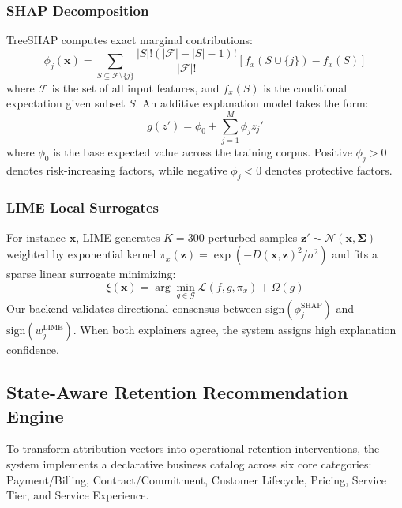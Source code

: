 \documentclass[conference]{IEEEtran}
\begin{document}
\subsubsection{SHAP Decomposition}
TreeSHAP computes exact marginal contributions:
\begin{equation}
    \phi_j(\mathbf{x}) = \sum_{S \subseteq \mathcal{F} \setminus \{j\}} \frac{|S|!(|\mathcal{F}| - |S| - 1)!}{|\mathcal{F}|!} \left[ f_x(S \cup \{j\}) - f_x(S) \right]
\end{equation}
where $\mathcal{F}$ is the set of all input features, and $f_x(S)$ is the conditional expectation given subset $S$. An additive explanation model takes the form:
\begin{equation}
    g(z') = \phi_0 + \sum_{j=1}^M \phi_j z_j'
\end{equation}
where $\phi_0$ is the base expected value across the training corpus. Positive $\phi_j > 0$ denotes risk-increasing factors, while negative $\phi_j < 0$ denotes protective factors.

\subsubsection{LIME Local Surrogates}
For instance $\mathbf{x}$, LIME generates $K=300$ perturbed samples $\mathbf{z}' \sim \mathcal{N}(\mathbf{x}, \boldsymbol{\Sigma})$ weighted by exponential kernel $\pi_x(\mathbf{z}) = \exp(-D(\mathbf{x}, \mathbf{z})^2 / \sigma^2)$ and fits a sparse linear surrogate minimizing:
\begin{equation}
    \xi(\mathbf{x}) = \arg\min_{g \in \mathcal{G}} \mathcal{L}(f, g, \pi_x) + \Omega(g)
\end{equation}
Our backend validates directional consensus between $\text{sign}(\phi_j^{\text{SHAP}})$ and $\text{sign}(w_j^{\text{LIME}})$. When both explainers agree, the system assigns high explanation confidence.

\subsection{State-Aware Retention Recommendation Engine}
To transform attribution vectors into operational retention interventions, the system implements a declarative business catalog across six core categories: Payment/Billing, Contract/Commitment, Customer Lifecycle, Pricing, Service Tier, and Service Experience.
\end{document}
